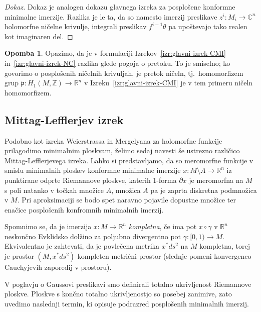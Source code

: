 \documentclass[12pt,a4paper,twoside]{article}
\theoremstyle{definition} %
\newtheorem{opomba}[definicija]{Opomba}
\newenvironment{dokaz}[1][Dokaz]{\begin{proof}[#1]}{\end{proof}}
\theoremstyle{plain} %
\numberwithin{equation}{section}  %
\newcommand{\R}{\mathbb R}
\begin{document}
\begin{dokaz}
Dokaz je analogen dokazu glavnega izreka za posplošene konformne minimalne imerzije. Razlika je le ta, da so namesto imerzij preslikave $z^{i} \colon M_{i} \to \mathbb{C}^{n}$ holomorfne ničelne krivulje, integrali preslikav $f^{i-1} \theta$ pa upoštevajo tako realen kot imaginaren del. 
\end{dokaz}

\begin{opomba}
Opazimo, da je v formulaciji Izrekov~\ref{izr:glavni-izrek-CMI} in~\ref{izr:glavni-izrek-NC} razlika glede pogoja o pretoku. To je smiselno; ko govorimo o posplošenih ničelnih krivuljah, je pretok ničeln, tj.~homomorfizem grup $\mathfrak{p} \colon H_{1}(M, \mathbb{Z}) \to \mathbb{R}^{n}$ v Izreku~\ref{izr:glavni-izrek-CMI} je v tem primeru ničeln homomorfizem.
\end{opomba}

\subsection{Mittag-Lefflerjev izrek}
%
Podobno kot izreka Weierstrassa in Mergelyana za holomorfne funkcije prilagodimo minimalnim ploskvam, želimo sedaj navesti še ustrezno različico Mittag-Lefflerjevega izreka. Lahko si predstavljamo, da so meromorfne funkcije v smislu minimalnih ploskev konformne minimalne imerzije $x \colon M \setminus A \to \R^{n}$ iz punktirane odprte Riemannove ploskve, katerih 1-forma $\partial x$ je meromorfna na $M$ s poli natanko v točkah množice $A$, množica $A$ pa je zaprta diskretna podmnožica v $M$.
Pri aproksimaciji se bodo spet naravno pojavile dopustne množice ter enačice posplošenih konfromnih minimalnih imerzij.

Spomnimo se, da je imerzija $x \colon M \to \R^{n}$ \emph{kompletna}, če ima pot $x \circ \gamma$ v $\R^{n}$ neskončno Evklidsko dolžino za poljubno divergentno pot $\gamma \colon [0,1) \to M$.
Ekvivalentno je zahtevati, da je povlečena metrika $x^{*}ds^2$ na $M$ kompletna, torej je prostor $(M, x^{*}ds^2)$ kompleten metrični prostor (slednje pomeni konvergenco Cauchyjevih zaporedij v prostoru).

V poglavju o Gaussovi preslikavi smo definirali totalno ukrivljenost Riemannove ploskve. Ploskve s končno totalno ukrivljenostjo so posebej zanimive, zato uvedimo naslednji termin, ki opisuje podrazred posplošenih minimalnih imerzij.
\end{document}
